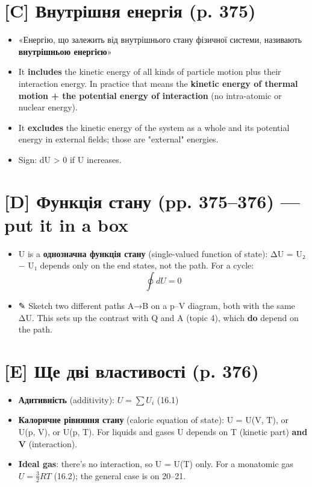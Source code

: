 \documentclass[11pt,a4paper,oneside]{book}
\newcommand{\pen}{{\sffamily\color{accent}✎}}
\begin{document}
\section*{[C] Внутрішня енергія (p. 375)}
\begin{itemize}
\item «Енергію, що залежить від внутрішнього стану фізичної системи, називають \textbf{внутрішньою енергією}»
\item It \textbf{includes} the kinetic energy of all kinds of particle motion plus their interaction energy. In practice that means the \textbf{kinetic energy of thermal motion + the potential energy of interaction} (no intra-atomic or nuclear energy).
\item It \textbf{excludes} the kinetic energy of the system as a whole and its potential energy in external fields; those are "external" energies.
\item Sign: dU > 0 if U increases.
\end{itemize}

\section*{[D] Функція стану (pp. 375–376) — put it in a box}
\begin{itemize}
\item U is a \textbf{однозначна функція стану} (single-valued function of state): ΔU = U₂ − U₁ depends only on the end states, not the path. For a cycle:
\[\oint dU = 0\]
\item \pen{} Sketch two different paths A→B on a p–V diagram, both with the same ΔU. This sets up the contrast with Q and A (topic 4), which \textbf{do} depend on the path.
\end{itemize}

\section*{[E] Ще дві властивості (p. 376)}
\begin{itemize}
\item \textbf{Адитивність} (additivity): $U = \sum U_i$ (16.1)
\item \textbf{Калоричне рівняння стану} (caloric equation of state): U = U(V, T), or U(p, V), or U(p, T). For liquids and gases U depends on T (kinetic part) \textbf{and V} (interaction).
\item \textbf{Ideal gas}: there's no interaction, so U = U(T) only. For a monatomic gas $U = \tfrac32RT$ (16.2); the general case is on 20–21.
\end{itemize}
\end{document}
